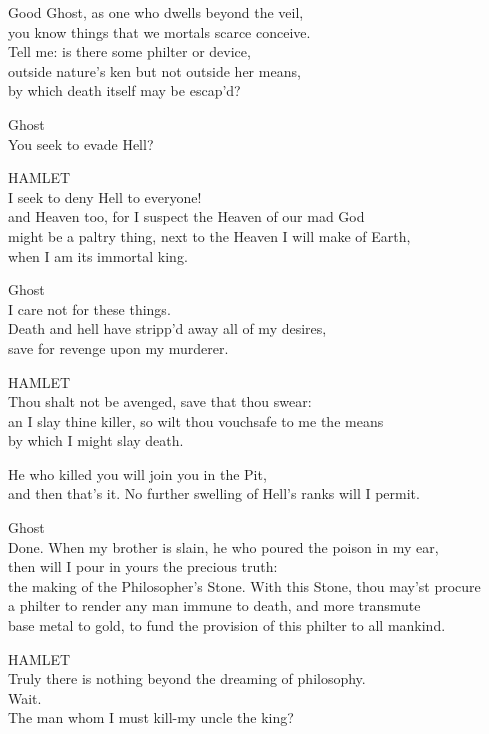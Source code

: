 Good Ghost, as one who dwells beyond the veil,\\
you know things that we mortals scarce conceive.\\
Tell me: is there some philter or device,\\
outside nature's ken but not outside her means,\\
by which death itself may be escap'd?

Ghost\\
You seek to evade Hell?

HAMLET\\
I seek to deny Hell to everyone!\\
and Heaven too, for I suspect the Heaven of our mad God\\
might be a paltry thing, next to the Heaven I will make of Earth,\\
when I am its immortal king.

Ghost\\
I care not for these things.\\
Death and hell have stripp'd away all of my desires,\\
save for revenge upon my murderer.

HAMLET\\
Thou shalt not be avenged, save that thou swear:\\
an I slay thine killer, so wilt thou vouchsafe to me the means\\
by which I might slay death.

He who killed you will join you in the Pit,\\
and then that's it. No further swelling of Hell's ranks will I permit.

Ghost\\
Done. When my brother is slain, he who poured the poison in my ear,\\
then will I pour in yours the precious truth:\\
the making of the Philosopher's Stone. With this Stone, thou may'st procure\\
a philter to render any man immune to death, and more transmute\\
base metal to gold, to fund the provision of this philter to all mankind.

HAMLET\\
Truly there is nothing beyond the dreaming of philosophy.\\
Wait.\\
The man whom I must kill-my uncle the king?

